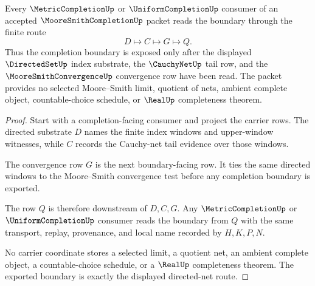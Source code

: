 \begin{theorem}
\label{thm:moore-smith-completion-net-boundary}
Every $\MetricCompletionUp$ or $\UniformCompletionUp$ consumer of an accepted $\MooreSmithCompletionUp$ packet reads the boundary through the finite route
$$
D \longmapsto C \longmapsto G \longmapsto Q .
$$
Thus the completion boundary is exposed only after the displayed $\DirectedSetUp$ index substrate, the $\CauchyNetUp$ tail row, and the $\MooreSmithConvergenceUp$ convergence row have been read. The packet provides no selected Moore--Smith limit, quotient of nets, ambient complete object, countable-choice schedule, or $\RealUp$ completeness theorem.
\end{theorem}
\begin{proof}
Start with a completion-facing consumer and project the carrier rows. The directed substrate $D$ names the finite index windows and upper-window witnesses, while $C$ records the Cauchy-net tail evidence over those windows.

The convergence row $G$ is the next boundary-facing row. It ties the same directed windows to the Moore--Smith convergence test before any completion boundary is exported.

The row $Q$ is therefore downstream of $D,C,G$. Any $\MetricCompletionUp$ or $\UniformCompletionUp$ consumer reads the boundary from $Q$ with the same transport, replay, provenance, and local name recorded by $H,K,P,N$.

No carrier coordinate stores a selected limit, a quotient net, an ambient complete object, a countable-choice schedule, or a $\RealUp$ completeness theorem. The exported boundary is exactly the displayed directed-net route.
\end{proof}


